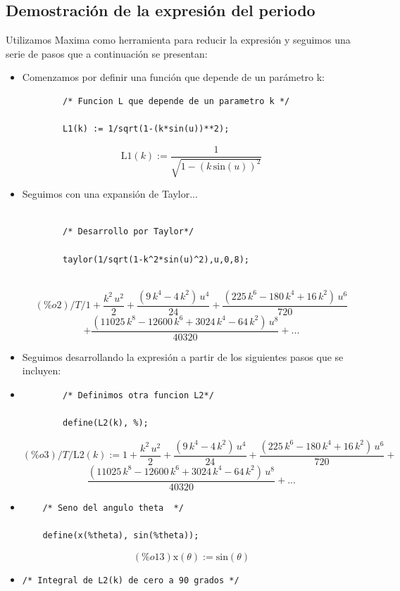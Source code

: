 \documentclass[12 pt]{article}
\begin{document}
	\subsection*{Demostración de la expresión del periodo}
	Utilizamos Maxima como herramienta para reducir la expresión y seguimos una serie de pasos que a continuación se presentan:
	\begin{itemize}
		\item Comenzamos por definir una función que depende de un parámetro k:
		\begin{verbatim}
		/* Funcion L que depende de un parametro k */
		
		L1(k) := 1/sqrt(1-(k*sin(u))**2);
		\end{verbatim}
		\[\mathrm{L1}\left( k\right) :=\frac{1}{\sqrt{1-{\left( k\,\mathrm{sin}\left( u\right) \right) }^{2}}}\]
		\item Seguimos con una expansión de Taylor...
		\begin{verbatim}
		
		/* Desarrollo por Taylor*/
		
		taylor(1/sqrt(1-k^2*sin(u)^2),u,0,8);
		
		\end{verbatim}
		\[(\%o2)/T/ 1+\frac{{k}^{2}\,{u}^{2}}{2}+\frac{\left( 9\,{k}^{4}-4\,{k}^{2}\right) \,{u}^{4}}{24}+\frac{\left( 225\,{k}^{6}-180\,{k}^{4}+16\,{k}^{2}\right) \,{u}^{6}}{720}\]  \[+\frac{\left( 11025\,{k}^{8}-12600\,{k}^{6}+3024\,{k}^{4}-64\,{k}^{2}\right) \,{u}^{8}}{40320}+...\]
		\item Seguimos desarrollando la expresión a partir de los siguientes pasos que se incluyen:
		\item \begin{verbatim}
		/* Definimos otra funcion L2*/
		
		define(L2(k), %);
		\end{verbatim}
	\[(\%o3)/T/ \mathrm{L2}\left( k\right) :=1+\frac{{k}^{2}\,{u}^{2}}{2}+\frac{\left( 9\,{k}^{4}-4\,{k}^{2}\right) \,{u}^{4}}{24}+\frac{\left( 225\,{k}^{6}-180\,{k}^{4}+16\,{k}^{2}\right) \,{u}^{6}}{720}+\]  \[\frac{\left( 11025\,{k}^{8}-12600\,{k}^{6}+3024\,{k}^{4}-64\,{k}^{2}\right) \,{u}^{8}}{40320}+...\]

	\item \begin{verbatim}
	/* Seno del angulo theta  */
	
	define(x(%theta), sin(%theta));
	\end{verbatim}
\[(\%o13) \mathrm{x}\left( \theta\right) :=\mathrm{sin}\left( \theta\right) \]
\item \begin{verbatim}
/* Integral de L2(k) de cero a 90 grados */


\end{verbatim}
\end{itemize}
\end{document}
